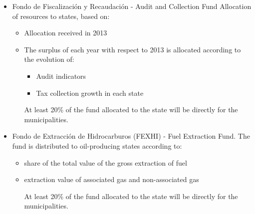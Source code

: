 \documentclass[dv_diss_main.tex]{subfiles}
\begin{document}
\begin{itemize}
\begin{itemize}
    \end{itemize}
    
    \item Fondo de Fiscalización y Recaudación - Audit and Collection Fund Allocation of resources to states, based on:
    
   \begin{itemize}
   \item Allocation received in 2013
   \item The surplus of each year with respect to 2013 is allocated according to the evolution of:
        \begin{itemize}
            \item Audit indicators
            \item Tax collection growth in each state
        \end{itemize}
   At least 20\% of the fund allocated to the state will be directly for the municipalities.
   \end{itemize}
   
    \item 	Fondo de Extracción de Hidrocarburos (FEXHI) - Fuel Extraction Fund. The fund is distributed to oil-producing states according to:
    
   \begin{itemize}
   \item share of the total value of the gross extraction of fuel
   \item extraction value of associated gas and non-associated gas
        
   At least 20\% of the fund allocated to the state will be directly for the municipalities.
   \end{itemize}
   
\end{itemize}
\end{document}
